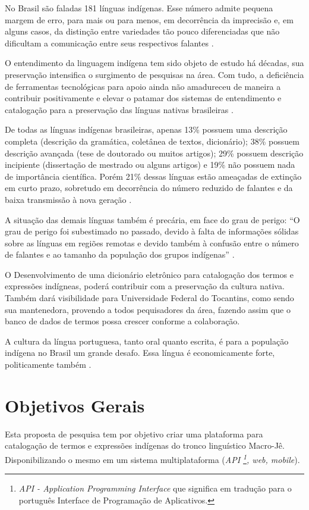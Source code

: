 \documentclass[journal]{IEEEtran}
\begin{document}
No Brasil são faladas 181 línguas indígenas. Esse número admite pequena margem de erro, para mais ou para menos, em decorrência da imprecisão e, em alguns casos, da distinção entre variedades tão pouco diferenciadas que não dificultam a comunicação entre seus respectivos falantes \cite{silvaterene2013}.

O entendimento da linguagem indígena tem sido objeto de estudo há décadas, sua preservação intensifica o surgimento de pesquisas na área. Com tudo, a deficiência de ferramentas tecnológicas para apoio ainda não amadureceu de maneira a contribuir positivamente e elevar o patamar dos sistemas de entendimento e catalogação para a preservação das línguas nativas brasileiras \cite{abreu2013dicionario}.

De todas as línguas indígenas brasileiras, apenas 13\% possuem uma descrição completa (descrição da gramática, coletânea de textos, dicionário); 38\% possuem descrição avançada (tese de doutorado ou muitos artigos); 29\% possuem descrição incipiente (dissertação de mestrado ou alguns artigos) e 19\% não possuem nada de importância científica. Porém 21\% dessas línguas estão ameaçadas de extinção em curto prazo, sobretudo em decorrência do número reduzido de falantes e da baixa transmissão à nova geração \cite{moore2008}. 

A situação das demais línguas também é precária, em face do grau de perigo: “O grau de perigo foi subestimado no passado, devido à falta de informações sólidas sobre as línguas em regiões remotas e devido também à confusão entre o número de falantes e ao tamanho da população dos grupos indígenas” \cite{moore2008}.

O Desenvolvimento de uma dicionário eletrônico para catalogação dos termos e expressões indígneas, poderá contribuir com a preservação da cultura nativa. Também dará visibilidade para Universidade Federal do Tocantins, como sendo sua mantenedora, provendo a todos pequisadores da área, fazendo assim que o banco de dados de termos possa crescer conforme a colaboração.

A cultura da língua portuguesa, tanto oral quanto escrita, é para a população indígena no Brasil um grande desafo. Essa língua é economicamente forte, politicamente também \cite{eduardo2018}.

\section{Objetivos Gerais}

Esta proposta de pesquisa tem por objetivo criar uma plataforma para catalogação de termos e expressões indígenas do tronco linguístico Macro-Jê. Disponibilizando o mesmo em um sistema multiplataforma ({\it API \footnote{{\it API - Application Programming Interface} que significa em tradução para o português Interface de Programação de Aplicativos.}, web, mobile}).
\end{document}

